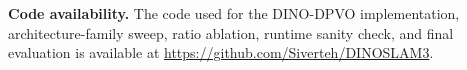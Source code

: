 \noindent\textbf{Code availability.}
The code used for the DINO-DPVO implementation, architecture-family sweep,
ratio ablation, runtime sanity check, and final evaluation is available at
\url{https://github.com/Siverteh/DINOSLAM3}.
